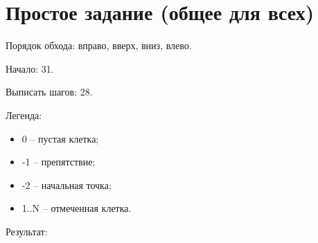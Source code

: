 \section{Простое задание (общее для всех)}

Порядок обхода: вправо, вверх, вниз, влево.

Начало: 31.

Выписать шагов: 28.

Легенда:
\begin{itemize}
	\item 0 -- пустая клетка;
	\item -1 -- препятствие;
	\item -2 -- начальная точка;
	\item 1..N -- отмеченная клетка.
\end{itemize}

Результат:

